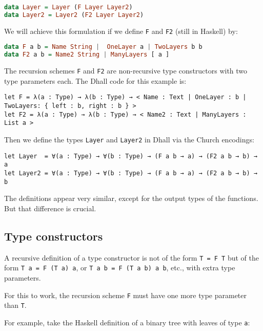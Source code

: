 \begin{lstlisting}[language=Haskell]
data Layer = Layer (F Layer Layer2)
data Layer2 = Layer2 (F2 Layer Layer2)
\end{lstlisting}


We will achieve this formulation if we define \lstinline!F! and \lstinline!F2! (still in Haskell) by:


\begin{lstlisting}[language=Haskell]
data F a b = Name String |  OneLayer a | TwoLayers b b
data F2 a b = Name2 String | ManyLayers [ a ]
\end{lstlisting}


The recursion schemes \lstinline!F! and \lstinline!F2! are non-recursive type constructors with two type parameters each. The Dhall code for this example is:


\begin{lstlisting}[language=Dhall]
let F = λ(a : Type) → λ(b : Type) → < Name : Text | OneLayer : b | TwoLayers: { left : b, right : b } >
let F2 = λ(a : Type) → λ(b : Type) → < Name2 : Text | ManyLayers : List a >
\end{lstlisting}


Then we define the types \lstinline!Layer! and \lstinline!Layer2! in Dhall via the Church encodings:


\begin{lstlisting}[language=Dhall]
let Layer  = ∀(a : Type) → ∀(b : Type) → (F a b → a) → (F2 a b → b) → a
let Layer2 = ∀(a : Type) → ∀(b : Type) → (F a b → a) → (F2 a b → b) → b
\end{lstlisting}


The definitions appear very similar, except for the output types of the functions.
But that difference is crucial.


\subsection{Type constructors}


A recursive definition of a type constructor is not of the form \lstinline!T = F T! but of the form \lstinline!T a = F (T a) a!, or \lstinline!T a b = F (T a b) a b!, etc., with extra type parameters.


For this to work, the recursion scheme \lstinline!F! must have one more type parameter than \lstinline!T!.


For example, take the Haskell definition of a binary tree with leaves of type \lstinline!a!:


